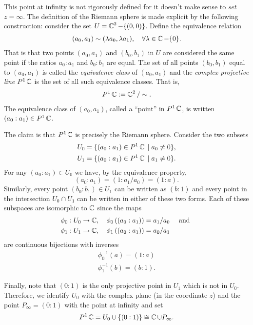 This point at infinity is not rigorously defined for it doesn't make
sense to {\it set} $z=\infty$. The definition of the Riemann sphere is
made explicit by the following construction: consider the set $U = \operatorname{\mathbb{C}}^2
- \{(0,0)\}$. Define the equivalence relation
\[
    (a_0, a_1) \sim (\lambda a_0, \lambda a_1),
    \quad \forall \lambda \in \operatorname{\mathbb{C}} - \{0\}.
\]
That is that two points $(a_0,a_1)$ and $(b_0,b_1)$ in $U$ are
considered the same point if the ratios $a_0 : a_1$ and $b_0 : b_1$ are
equal. The set of all points $(b_0,b_1)$ equal to $(a_0,a_1)$ is called
the {\it equivalence class} of $(a_0,a_1)$ and the {\it complex
  projective line} $P^1\operatorname{\mathbb{C}}$ is the set of all such equivalence
classes. That is,
\[
    P^1\operatorname{\mathbb{C}} := \operatorname{\mathbb{C}}^2 / \sim.
\]
The equivalence class of $(a_0,a_1)$, called a ``point'' in $P^1\operatorname{\mathbb{C}}$, is
written $(a_0 : a_1) \in P^1\operatorname{\mathbb{C}}$.

The claim is that $P^1\operatorname{\mathbb{C}}$ is precisely the Riemann sphere. Consider the
two subsets
\begin{align*}
    U_0 &= \{ (a_0 : a_1) \in P^1\operatorname{\mathbb{C}} \; | \; a_0 \neq 0 \}, \\
    U_1 &= \{ (a_0 : a_1) \in P^1\operatorname{\mathbb{C}} \; | \; a_1 \neq 0 \}.
\end{align*}
For any $(a_0 : a_1) \in U_0$ we have, by the equivalence property,
\[
    (a_0 : a_1) = (1 : a_1/a_0) = (1 : a).
\]
Similarly, every point $(b_0 : b_1) \in U_1$ can be written as $(b : 1)$
and every point in the intersection $U_0 \cap U_1$ can be written in
either of these two forms. Each of these subspaces are isomorphic to
$\operatorname{\mathbb{C}}$ since the maps
\begin{align*}
  \phi_0 : U_0 \to \operatorname{\mathbb{C}},
  \quad
  \phi_0 \left( (a_0 : a_1) \right) = a_1 / a_0
  & \quad \text{ and } \\
  \phi_1 : U_1 \to \operatorname{\mathbb{C}},
  \quad
  \phi_1 \left( (a_0 : a_1) \right) = a_0 / a_1 &
\end{align*}
are continuous bijections with inverses
\begin{gather}
  \phi^{-1}_0(a) = (1 : a) \\
  \phi^{-1}_1(b) = (b : 1).
\end{gather}

Finally, note that $(0 : 1)$ is the only projective point in $U_1$ which
is not in $U_0$. Therefore, we identify $U_0$ with the complex plane (in
the coordinate $z$) and the point $P_\infty = (0 : 1)$ with the point at
infinity and set
\begin{equation} \label{eqn: projective-line}
  P^1\operatorname{\mathbb{C}} = U_0 \cup \{ (0 : 1) \} \cong \operatorname{\mathbb{C}} \cup P_\infty.
\end{equation}

